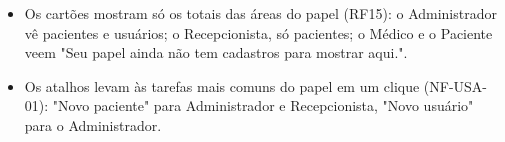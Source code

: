 \begin{itemize}[leftmargin=*,itemsep=0.3em]

\item Os cartões mostram só os totais das áreas do papel (RF15): o Administrador vê pacientes e usuários; o Recepcionista, só pacientes; o Médico e o Paciente veem "Seu papel ainda não tem cadastros para mostrar aqui.".

\item Os atalhos levam às tarefas mais comuns do papel em um clique (NF-USA-01): "Novo paciente" para Administrador e Recepcionista, "Novo usuário" para o Administrador.

\end{itemize}

\endgroup
